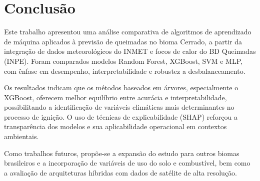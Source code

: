 
\chapter{Conclusão}

Este trabalho apresentou uma análise comparativa de algoritmos de aprendizado de máquina aplicados à previsão de queimadas no bioma Cerrado, a partir da integração de dados meteorológicos do INMET e focos de calor do BD Queimadas (INPE). Foram comparados modelos Random Forest, XGBoost, SVM e MLP, com ênfase em desempenho, interpretabilidade e robustez a desbalanceamento.

Os resultados indicam que os métodos baseados em árvores, especialmente o XGBoost, oferecem melhor equilíbrio entre acurácia e interpretabilidade, possibilitando a identificação de variáveis climáticas mais determinantes no processo de ignição. O uso de técnicas de explicabilidade (SHAP) reforçou a transparência dos modelos e sua aplicabilidade operacional em contextos ambientais.

Como trabalhos futuros, propõe-se a expansão do estudo para outros biomas brasileiros e a incorporação de variáveis de uso do solo e combustível, bem como a avaliação de arquiteturas híbridas com dados de satélite de alta resolução.
